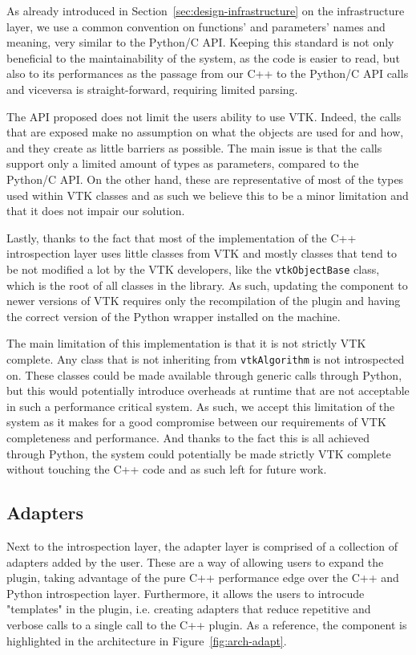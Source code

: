 As already introduced in Section~\ref{sec:design-infrastructure} on the infrastructure layer, we use a common convention on functions' and parameters' names and meaning, very similar to the Python/C API. Keeping this standard is not only beneficial to the maintainability of the system, as the code is easier to read, but also to its performances as the passage from our C++ to the Python/C API calls and viceversa is straight-forward, requiring limited parsing.

The API proposed does not limit the users ability to use VTK. Indeed, the calls that are exposed make no assumption on what the objects are used for and how, and they create as little barriers as possible. The main issue is that the calls support only a limited amount of types as parameters, compared to the Python/C API. On the other hand, these are representative of most of the types used within VTK classes and as such we believe this to be a minor limitation and that it does not impair our solution.

Lastly, thanks to the fact that most of the implementation of the C++ introspection layer uses little classes from VTK and mostly classes that tend to be not modified a lot by the VTK developers, like the \verb|vtkObjectBase| class, which is the root of all classes in the library. As such, updating the component to newer versions of VTK requires only the recompilation of the plugin and having the correct version of the Python wrapper installed on the machine.

The main limitation of this implementation is that it is not strictly VTK complete. Any class that is not inheriting from \verb|vtkAlgorithm| is not introspected on. These classes could be made available through generic calls through Python, but this would potentially introduce overheads at runtime that are not acceptable in such a performance critical system. As such, we accept this limitation of the system as it makes for a good compromise between our requirements of VTK completeness and performance. And thanks to the fact this is all achieved through Python, the system could potentially be made strictly VTK complete without touching the C++ code and as such left for future work.

\subsection{Adapters}
\label{sec:design-adapters}

Next to the introspection layer, the adapter layer is comprised of a collection of adapters added by the user. These are a way of allowing users to expand the plugin, taking advantage of the pure C++ performance edge over the C++ and Python introspection layer. Furthermore, it allows the users to introcude "templates" in the plugin, i.e. creating adapters that reduce repetitive and verbose calls to a single call to the C++ plugin. As a reference, the component is highlighted in the architecture in Figure~\ref{fig:arch-adapt}.


